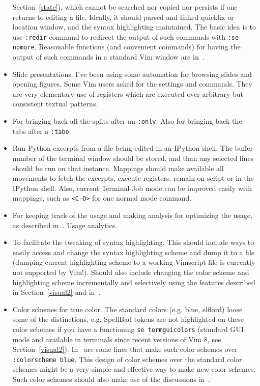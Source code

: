 \documentclass{article}
\newcommand{\ttt}[1] {
	\texttt{<#1>}}
\newcommand{\tttt}[1]{\texttt{#1}}
\begin{document}
\begin{itemize}
        Section~\ref{state}),
        which cannot be searched nor copied nor persists if one
        returns to editing a file.
        Ideally, it should parsed and linked quickfix or location
        window, and the syntax highlighting maintained.
        The basic idea is to use \tttt{:redir} command to redirect the output
        of such commands with \tttt{:se nomore}.
        Reasonable functions (and convenient commands) for having the
        output of such commands in a standard Vim window are
        in~\cite{vimrc}.
      \item Slide presentations. I've been using some automation for browsing
        slides and opening figures. Some Vim users asked for the settings and
        commands. They are very elementary use of registers which are executed over
        arbitrary but consistent textual patterns.
      \item For bringing back all the splits after an \tttt{:only}.
        Also for bringing back the tabs after a \tttt{:tabo}.
      \item Run Python excerpts from a file being edited in an IPython shell. 
        The buffer number of the terminal window should be stored,
        and than any selected lines should be run on that instance.
        Mappings should make available all movements to fetch the
        excerpts, execute registers, remain on script or in the IPython shell.
        Also, current Terminal-Job mode can be improved easily with
        mappings, such as \ttt{C-O} for one normal mode command.
      \item For keeping track of the usage and making analysis
        for optimizing the usage, as described in~\cite{http://www.drbunsen.org/vim-croquet/}.
        Usage analytics.
      \item To facilitate the tweaking of syntax highlighting.
        This should include ways to easily access and change the
        syntax highlighting scheme and dump it to a file (dumping
        current highlighting scheme to a working Vimscript file
        is currently not supported by Vim!).
        Should also include changing the color scheme and highlighting scheme incrementally
        and selectively using the features described in Section~\ref{visual2}
        and in~\cite{tokipona}.
      \item Color schemes for true color.
        The standard colors (e.g. blue, elflord) loose some of the distinctions,
        e.g. SpellBad tokens are not highlighted on these color schemes
        if you have a functioning \tttt{se termguicolors} (standard GUI mode
        and available in terminals since recent versions of Vim 8,
        see Section~\ref{visual2}).
        In~\cite{vimrc} are some lines that make such color schemes over
        \tttt{:colorscheme blue}.
        This design of color schemes over the standard color schemes might be
        a very simple and effective way to make new color schemes.
        Such color schemes should also make use of the discussions
        in~\cite{tokipona}.
    \end{itemize}
\end{document}
